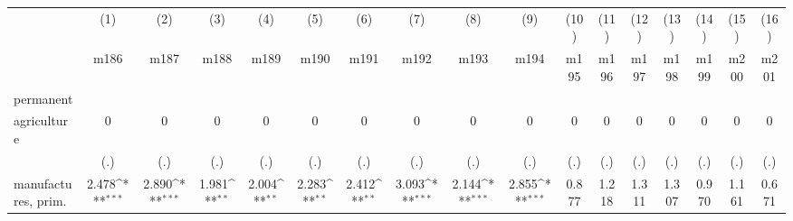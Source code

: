 {
\def\sym#1{\ifmmode^{#1}\else\(^{#1}\)\fi}
\begin{tabular}{l*{16}{c}}
\hline\hline
                    &\multicolumn{1}{c}{(1)}&\multicolumn{1}{c}{(2)}&\multicolumn{1}{c}{(3)}&\multicolumn{1}{c}{(4)}&\multicolumn{1}{c}{(5)}&\multicolumn{1}{c}{(6)}&\multicolumn{1}{c}{(7)}&\multicolumn{1}{c}{(8)}&\multicolumn{1}{c}{(9)}&\multicolumn{1}{c}{(10)}&\multicolumn{1}{c}{(11)}&\multicolumn{1}{c}{(12)}&\multicolumn{1}{c}{(13)}&\multicolumn{1}{c}{(14)}&\multicolumn{1}{c}{(15)}&\multicolumn{1}{c}{(16)}\\
                    &\multicolumn{1}{c}{m186}&\multicolumn{1}{c}{m187}&\multicolumn{1}{c}{m188}&\multicolumn{1}{c}{m189}&\multicolumn{1}{c}{m190}&\multicolumn{1}{c}{m191}&\multicolumn{1}{c}{m192}&\multicolumn{1}{c}{m193}&\multicolumn{1}{c}{m194}&\multicolumn{1}{c}{m195}&\multicolumn{1}{c}{m196}&\multicolumn{1}{c}{m197}&\multicolumn{1}{c}{m198}&\multicolumn{1}{c}{m199}&\multicolumn{1}{c}{m200}&\multicolumn{1}{c}{m201}\\
\hline
permanent           &                     &                     &                     &                     &                     &                     &                     &                     &                     &                     &                     &                     &                     &                     &                     &                     \\
agriculture         &           0         &           0         &           0         &           0         &           0         &           0         &           0         &           0         &           0         &           0         &           0         &           0         &           0         &           0         &           0         &           0         \\
                    &         (.)         &         (.)         &         (.)         &         (.)         &         (.)         &         (.)         &         (.)         &         (.)         &         (.)         &         (.)         &         (.)         &         (.)         &         (.)         &         (.)         &         (.)         &         (.)         \\
[1em]
manufactures, prim. &       2.478\sym{***}&       2.890\sym{***}&       1.981\sym{**} &       2.004\sym{**} &       2.283\sym{**} &       2.412\sym{**} &       3.093\sym{***}&       2.144\sym{***}&       2.855\sym{***}&       0.877         &       1.218         &       1.311         &       1.307         &       0.970         &       1.161         &       0.671         \\

\end{tabular}}
